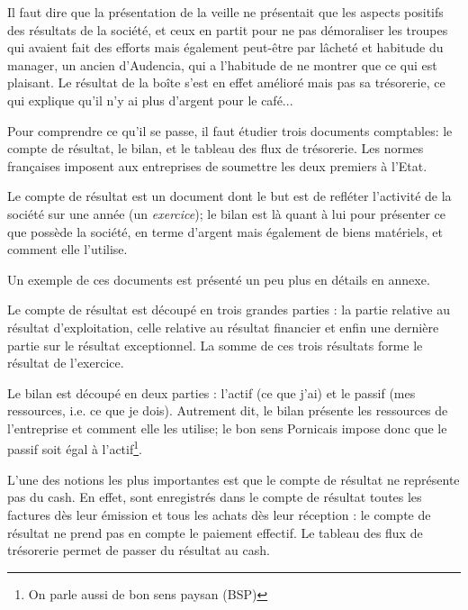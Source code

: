 Il faut dire que la présentation de la veille ne présentait 
que les aspects positifs des résultats de la société, et 
ceux en partit pour ne pas démoraliser les troupes qui avaient 
fait des efforts mais également peut-être par lâcheté et 
habitude du manager, un ancien d'Audencia, qui a l'habitude de 
ne montrer que ce qui est plaisant. 
Le résultat de la boîte s'est en effet amélioré mais pas sa 
trésorerie, ce qui explique qu'il n'y ai plus d'argent pour 
le café... 

Pour comprendre ce qu'il se passe, il faut étudier trois 
documents comptables: le compte de résultat, le bilan, et le 
tableau des flux de trésorerie. 
Les normes françaises imposent aux entreprises de soumettre 
les deux premiers à l'Etat.

Le compte de résultat est un document dont le but est de 
refléter l'activité de la société sur une année (un \emph{exercice});
le bilan est là quant à lui pour 
présenter ce que possède la société, en terme d'argent mais 
également de biens matériels, et comment elle l'utilise.

Un exemple de ces documents est présenté un peu plus en détails en annexe.

Le compte de résultat est découpé en trois grandes parties : 
la partie relative au résultat d'exploitation, celle relative 
au résultat financier et enfin une dernière partie sur le 
résultat exceptionnel. La somme de ces trois résultats forme 
le résultat de l'exercice.

Le bilan est découpé en deux parties : l'actif (ce que j'ai) 
et le passif (mes ressources, i.e. ce que je dois).
Autrement dit, le bilan présente les ressources de l'entreprise 
et comment elle les utilise; le bon sens Pornicais impose donc que 
le passif soit égal à l'actif\footnote{On parle aussi de bon sens paysan (BSP)}.

L'une des notions les plus importantes est que le compte 
de résultat ne représente pas du cash. En effet, sont 
enregistrés dans le compte de résultat toutes les factures dès 
leur émission et tous les achats dès leur réception : le 
compte de résultat ne prend pas en compte le paiement effectif.
Le tableau des flux de trésorerie permet de passer du 
résultat au cash.



